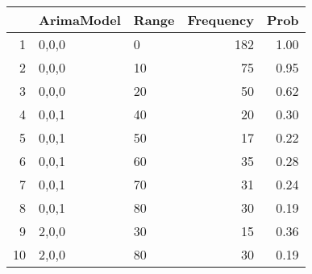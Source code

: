 \begin{table}[ht]
\centering
\begin{tabular}{rllrr}
  \hline
 & ArimaModel & Range & Frequency & Prob \\ 
  \hline
1 & 0,0,0 & 0 & 182 & 1.00 \\ 
  2 & 0,0,0 & 10 &  75 & 0.95 \\ 
  3 & 0,0,0 & 20 &  50 & 0.62 \\ 
  4 & 0,0,1 & 40 &  20 & 0.30 \\ 
  5 & 0,0,1 & 50 &  17 & 0.22 \\ 
  6 & 0,0,1 & 60 &  35 & 0.28 \\ 
  7 & 0,0,1 & 70 &  31 & 0.24 \\ 
  8 & 0,0,1 & 80 &  30 & 0.19 \\ 
  9 & 2,0,0 & 30 &  15 & 0.36 \\ 
  10 & 2,0,0 & 80 &  30 & 0.19 \\ 
   \hline
\end{tabular}
\end{table}
